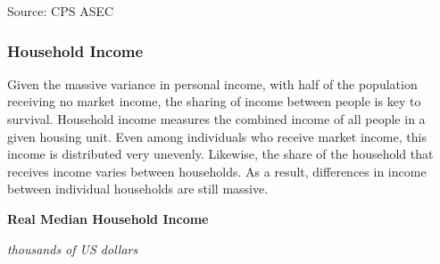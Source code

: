 \documentclass{report}
\newcommand{\tbllink}[1]{\href{https://raw.githubusercontent.com/bdecon/US-chartbook/master/chartbook/data/#1}{\faTable}}
\begin{document}
{{{\begin{minipage}{0.76\textwidth}

\footnotesize{Source: CPS ASEC} \hspace{42mm} \tbllink{pearn_dist.csv}
\end{minipage}

\newpage 

\subsubsection*{\color{black!70} \seriffont Household Income}

\begin{minipage}{0.76\textwidth} 
\small Given the massive variance in personal income, with half of the population receiving no market income, the sharing of income between people is key to survival. Household income measures the combined income of all people in a given housing unit. Even among individuals who receive market income, this income is distributed very unevenly. Likewise, the share of the household that receives income varies between households. As a result, differences in income between individual households are still massive. 

\end{minipage}

\vspace{1mm}

\begin{minipage}{0.37\textwidth}
\normalsize \textbf{Real Median Household Income}

\footnotesize{\textit{thousands of US dollars}}


\end{minipage}}}}
\end{document}
